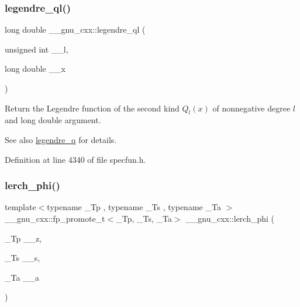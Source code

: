 \subsubsection{\texorpdfstring{legendre\+\_\+ql()}{legendre\_ql()}}
{\footnotesize\ttfamily long double \+\_\+\+\_\+gnu\+\_\+cxx\+::legendre\+\_\+ql (\begin{DoxyParamCaption}\item[{unsigned int}]{\+\_\+\+\_\+l,  }\item[{long double}]{\+\_\+\+\_\+x }\end{DoxyParamCaption})\hspace{0.3cm}{\ttfamily [inline]}}

Return the Legendre function of the second kind $ Q_l(x) $ of nonnegative degree $ l $ and {\ttfamily long double} argument.

\begin{DoxySeeAlso}{See also}
\hyperlink{group__gnu__math__spec__func_gadad5b22d0075dca31690907668af568f}{legendre\+\_\+q} for details. 
\end{DoxySeeAlso}


Definition at line 4340 of file specfun.\+h.

\mbox{\label{group__gnu__math__spec__func_ga31d7cfc601a99d72e58f654d0c890fd6}} 
\subsubsection{\texorpdfstring{lerch\+\_\+phi()}{lerch\_phi()}}
{\footnotesize\ttfamily template$<$typename \+\_\+\+Tp , typename \+\_\+\+Ts , typename \+\_\+\+Ta $>$ \\
\+\_\+\+\_\+gnu\+\_\+cxx\+::fp\+\_\+promote\+\_\+t$<$\+\_\+\+Tp, \+\_\+\+Ts, \+\_\+\+Ta$>$ \+\_\+\+\_\+gnu\+\_\+cxx\+::lerch\+\_\+phi (\begin{DoxyParamCaption}\item[{\+\_\+\+Tp}]{\+\_\+\+\_\+z,  }\item[{\+\_\+\+Ts}]{\+\_\+\+\_\+s,  }\item[{\+\_\+\+Ta}]{\+\_\+\+\_\+a }\end{DoxyParamCaption})\hspace{0.3cm}{\ttfamily [inline]}}

